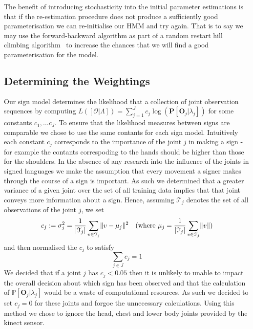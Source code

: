 The benefit of introducing stochasticity into the initial parameter estimations is that if the re-estimation procedure does not produce a sufficiently good parameterisation we can re-initialise our HMM and try again. That is to say we may use the forward-backward algorithm as part of a random restart hill climbing algorithm~\citep{russell1995artificial} to increase the chances that we will find a good parameterisation for the model.

\subsection{Determining the Weightings}
Our sign model determines the likelihood that a collection of joint observation sequences by computing $L([\mathcal{O} | \Lambda ]) = \sum_{j=1}^{J} c_j \log(\mathbf{P}[\mathbf{O}_j | \lambda_j])$ for some constants $c_1, \dots c_J$. To ensure that the likelihood measures between signs are comparable we chose to use the same contants for each sign model. Intuitively each constant $c_j$ corresponds to the importance of the joint $j$ in making a sign - for example the contants correspoding to the hands should be higher than those for the shoulders. In the absence of any research into the influence of the joints in signed languages we make the assumption that every movement a signer makes through the course of a sign is important. As such we determined that a greater variance of a given joint over the set of all training data implies that that joint conveys more information about a sign. Hence, assuming $\mathcal{T}_j$ denotes the set of all observations of the joint $j$, we set
\begin{align*}
c_j := \sigma^2_j &= \frac{1}{\lvert\mathcal{T}_j\rvert}\sum_{v \in \mathcal{T}_j} \lVert v - \mu_j\rVert^2 &(\text{where } \mu_j = \frac{1}{\lvert\mathcal{T}_j\rvert}\sum_{v \in\mathcal{T}_j}\lVert v\rVert)
\end{align*}
and then normalised the $c_j$ to satisfy
\begin{equation*}
\sum_{j \in J} c_j = 1
\end{equation*}
We decided that if a joint $j$ has $c_j < 0.05$ then it is unlikely to unable to impact the overall decision about which sign has been observed and that the calculation of $\mathbb{P}[\mathbf{O}_j | \lambda_j]$ would be a waste of computational resources. As such we decided to set $c_j = 0$ for these joints and forgoe the unnecessary calculations. Using this method we chose to ignore the head, chest and lower body joints provided by the kinect sensor.

